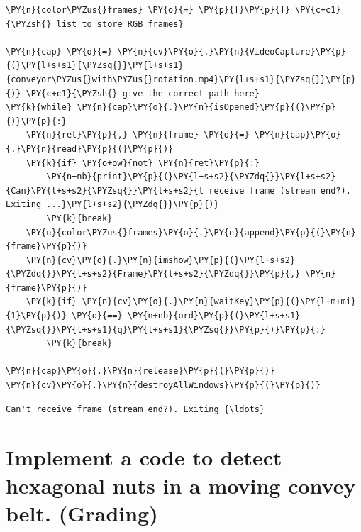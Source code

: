 \documentclass[a4paper,11pt]{article}%
\begin{document}
    \begin{tcolorbox}[breakable, size=fbox, boxrule=1pt, pad at break*=1mm,colback=cellbackground, colframe=cellborder]
\begin{Verbatim}[commandchars=\\\{\}]
\PY{n}{color\PYZus{}frames} \PY{o}{=} \PY{p}{[}\PY{p}{]} \PY{c+c1}{\PYZsh{} list to store RGB frames}

\PY{n}{cap} \PY{o}{=} \PY{n}{cv}\PY{o}{.}\PY{n}{VideoCapture}\PY{p}{(}\PY{l+s+s1}{\PYZsq{}}\PY{l+s+s1}{conveyor\PYZus{}with\PYZus{}rotation.mp4}\PY{l+s+s1}{\PYZsq{}}\PY{p}{)} \PY{c+c1}{\PYZsh{} give the correct path here}
\PY{k}{while} \PY{n}{cap}\PY{o}{.}\PY{n}{isOpened}\PY{p}{(}\PY{p}{)}\PY{p}{:}
    \PY{n}{ret}\PY{p}{,} \PY{n}{frame} \PY{o}{=} \PY{n}{cap}\PY{o}{.}\PY{n}{read}\PY{p}{(}\PY{p}{)}
    \PY{k}{if} \PY{o+ow}{not} \PY{n}{ret}\PY{p}{:}
        \PY{n+nb}{print}\PY{p}{(}\PY{l+s+s2}{\PYZdq{}}\PY{l+s+s2}{Can}\PY{l+s+s2}{\PYZsq{}}\PY{l+s+s2}{t receive frame (stream end?). Exiting ...}\PY{l+s+s2}{\PYZdq{}}\PY{p}{)}
        \PY{k}{break}
    \PY{n}{color\PYZus{}frames}\PY{o}{.}\PY{n}{append}\PY{p}{(}\PY{n}{frame}\PY{p}{)}
    \PY{n}{cv}\PY{o}{.}\PY{n}{imshow}\PY{p}{(}\PY{l+s+s2}{\PYZdq{}}\PY{l+s+s2}{Frame}\PY{l+s+s2}{\PYZdq{}}\PY{p}{,} \PY{n}{frame}\PY{p}{)}
    \PY{k}{if} \PY{n}{cv}\PY{o}{.}\PY{n}{waitKey}\PY{p}{(}\PY{l+m+mi}{1}\PY{p}{)} \PY{o}{==} \PY{n+nb}{ord}\PY{p}{(}\PY{l+s+s1}{\PYZsq{}}\PY{l+s+s1}{q}\PY{l+s+s1}{\PYZsq{}}\PY{p}{)}\PY{p}{:}
        \PY{k}{break}

\PY{n}{cap}\PY{o}{.}\PY{n}{release}\PY{p}{(}\PY{p}{)}
\PY{n}{cv}\PY{o}{.}\PY{n}{destroyAllWindows}\PY{p}{(}\PY{p}{)}
\end{Verbatim}
\end{tcolorbox}

    \begin{Verbatim}[commandchars=\\\{\}]
Can't receive frame (stream end?). Exiting {\ldots}
    \end{Verbatim}

    \hypertarget{implement-a-code-to-detect-hexagonal-nuts-in-a-moving-convey-belt.-grading}{%
\section{Implement a code to detect hexagonal nuts in a moving
convey belt.
(Grading)}\label{implement-a-code-to-detect-hexagonal-nuts-in-a-moving-convey-belt.-grading}}
\end{document}
